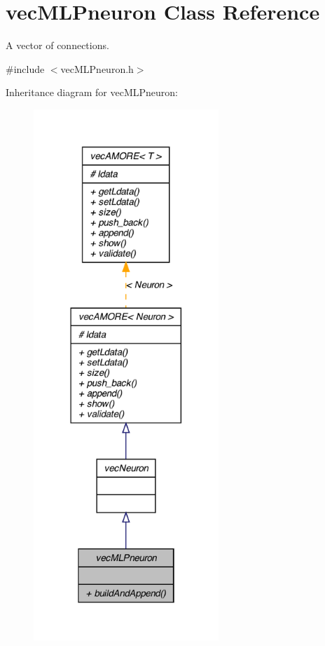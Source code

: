 \hypertarget{classvec_m_l_pneuron}{
\section{vecMLPneuron Class Reference}
\label{classvec_m_l_pneuron}
}


A vector of connections.  




{\ttfamily \#include $<$vecMLPneuron.h$>$}



Inheritance diagram for vecMLPneuron:
\nopagebreak
\begin{figure}[H]
\begin{center}
\leavevmode
\includegraphics[width=198pt]{classvec_m_l_pneuron__inherit__graph}
\end{center}
\end{figure}


